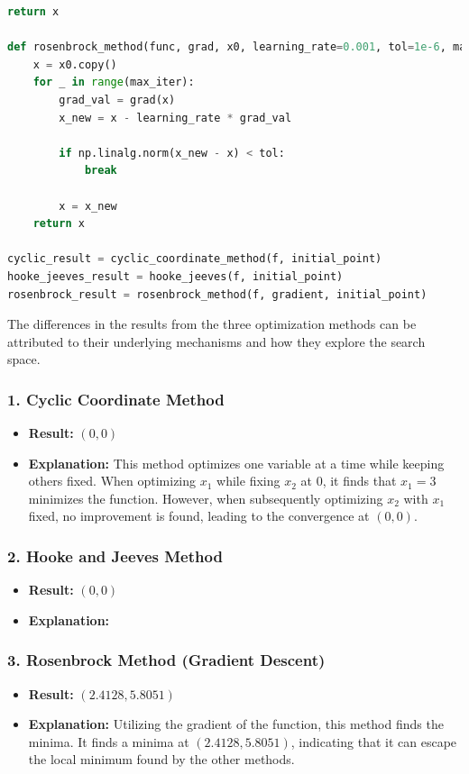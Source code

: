 \documentclass{article}
\begin{document}
\begin{lstlisting}[language=Python]
    return x
    
def rosenbrock_method(func, grad, x0, learning_rate=0.001, tol=1e-6, max_iter=10000):
    x = x0.copy()
    for _ in range(max_iter):
        grad_val = grad(x)
        x_new = x - learning_rate * grad_val
        
        if np.linalg.norm(x_new - x) < tol:
            break
        
        x = x_new
    return x

cyclic_result = cyclic_coordinate_method(f, initial_point)
hooke_jeeves_result = hooke_jeeves(f, initial_point)
rosenbrock_result = rosenbrock_method(f, gradient, initial_point)
\end{lstlisting}

The differences in the results from the three optimization methods can be attributed to their underlying mechanisms and how they explore the search space.
\subsubsection*{1. Cyclic Coordinate Method}
\begin{itemize}
    \item \textbf{Result:} \((0, 0)\)
    \item \textbf{Explanation:} This method optimizes one variable at a time while keeping others fixed. When optimizing \(x_1\) while fixing \(x_2\) at 0, it finds that \(x_1 = 3\) minimizes the function. However, when subsequently optimizing \(x_2\) with \(x_1\) fixed, no improvement is found, leading to the convergence at \((0, 0)\).
\end{itemize}

\subsubsection*{2. Hooke and Jeeves Method}
\begin{itemize}
    \item \textbf{Result:} \((0, 0)\)
    \item \textbf{Explanation:} 
\end{itemize}

\subsubsection*{3. Rosenbrock Method (Gradient Descent)}
\begin{itemize}
    \item \textbf{Result:} \((2.4128, 5.8051)\)
    \item \textbf{Explanation:} Utilizing the gradient of the function, this method finds the minima. It finds a minima at \((2.4128, 5.8051)\), indicating that it can escape the local minimum found by the other methods.
\end{itemize}
\end{document}
